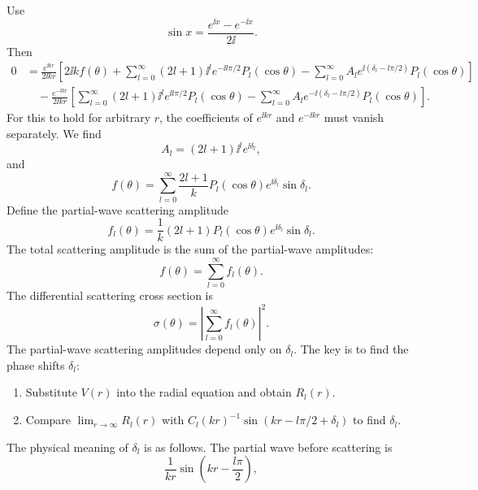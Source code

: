 Use
\begin{equation}
\sin x=\frac{e^{\ii x}-e^{-\ii x}}{2\ii}.
\end{equation}
Then
\begin{equation}\begin{aligned}
0&=\frac{e^{\ii kr}}{2\ii kr}
\left[2\ii kf(\theta)+\sum_{l=0}^\infty(2l+1)\ii^l e^{-\ii l\pi/2}P_l(\cos\theta)
-\sum_{l=0}^\infty A_le^{\ii(\delta_l-l\pi/2)}P_l(\cos\theta)\right]\\
&\quad-\frac{e^{-\ii kr}}{2\ii kr}
\left[\sum_{l=0}^\infty(2l+1)\ii^l e^{\ii l\pi/2}P_l(\cos\theta)
-\sum_{l=0}^\infty A_le^{-\ii(\delta_l-l\pi/2)}P_l(\cos\theta)\right].
\end{aligned}\end{equation}
For this to hold for arbitrary $r$, the coefficients of $e^{\ii kr}$ and $e^{-\ii kr}$ must vanish separately. We find
\begin{equation}
A_l=(2l+1)\ii^l e^{\ii\delta_l},
\end{equation}
and
\begin{equation}
\boxed{f(\theta)=\sum_{l=0}^\infty\frac{2l+1}{k}
P_l(\cos\theta)e^{\ii\delta_l}\sin\delta_l}.
\end{equation}
Define the partial-wave scattering amplitude
\begin{equation}
\boxed{f_l(\theta)=\frac1k(2l+1)P_l(\cos\theta)e^{\ii\delta_l}\sin\delta_l}.
\end{equation}
The total scattering amplitude is the sum of the partial-wave amplitudes:
\begin{equation}
f(\theta)=\sum_{l=0}^\infty f_l(\theta).
\end{equation}
The differential scattering cross section is
\begin{equation}
\boxed{\sigma(\theta)=\left|\sum_{l=0}^\infty f_l(\theta)\right|^2}.
\end{equation}
The partial-wave scattering amplitudes depend only on $\delta_l$. The key is to find the phase shifts $\delta_l$:
\begin{enumerate}
\item Substitute $V(r)$ into the radial equation and obtain $R_l(r)$.
\item Compare $\lim_{r\to\infty}R_l(r)$ with $C_l(kr)^{-1}\sin(kr-l\pi/2+\delta_l)$ to find $\delta_l$.
\end{enumerate}
The physical meaning of $\delta_l$ is as follows. The partial wave before scattering is
\begin{equation}
\frac1{kr}\sin\left(kr-\frac{l\pi}2\right),
\end{equation}
